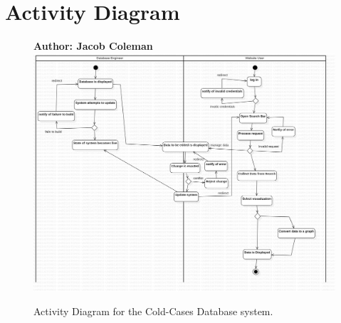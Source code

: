 \documentclass[11pt]{article}
\begin{document}
\section*{Activity Diagram}

\begin{figure}[!ht]
\centering
\textbf{Author: Jacob Coleman}
	\includegraphics[width=.95\textwidth]{./Activity Diagram/Activitydiagramredo}\\
	\caption{Activity Diagram for the Cold-Cases Database system.}
	\label{fig:activity_diagram}
\end{figure}
\end{document}
